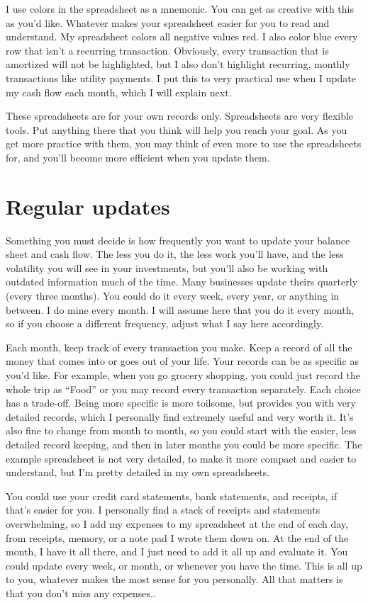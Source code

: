 I use colors in the spreadsheet as a mnemonic. You can get as creative with this as you'd like. Whatever makes your spreadsheet easier for you to read and understand. My spreadsheet colors all negative values red. I also color blue every row that isn't a recurring transaction. Obviously, every transaction that is amortized will not be highlighted, but I also don't highlight recurring, monthly transactions like utility payments. I put this to very practical use when I update my cash flow each month, which I will explain next.

These spreadsheets are for your own records only. Spreadsheets are very flexible tools. Put anything there that you think will help you reach your goal. As you get more practice with them, you may think of even more to use the spreadsheets for, and you'll become more efficient when you update them.

\section{Regular updates}
Something you must decide is how frequently you want to update your balance sheet and cash flow. The less you do it, the less work you'll have, and the less volatility you will see in your investments, but you'll also be working with outdated information much of the time. Many businesses update theirs quarterly (every three months). You could do it every week, every year, or anything in between. I do mine every month. I will assume here that you do it every month, so if you choose a different frequency, adjust what I say here accordingly.

Each month, keep track of every transaction you make. Keep a record of all the money that comes into or goes out of your life. Your records can be as specific as you'd like. For example, when you go grocery shopping, you could just record the whole trip as ``Food'' or you may record every transaction separately. Each choice has a trade-off. Being more specific is more toilsome, but provides you with very detailed records, which I personally find extremely useful and very worth it. It's also fine to change from month to month, so you could start with the easier, less detailed record keeping, and then in later months you could be more specific. The example spreadsheet is not very detailed, to make it more compact and easier to understand, but I'm pretty detailed in my own spreadsheets.

You could use your credit card statements, bank statements, and receipts, if that's easier for you. I personally find a stack of receipts and statements overwhelming, so I add my expenses to my spreadsheet at the end of each day, from receipts, memory, or a note pad I wrote them down on. At the end of the month, I have it all there, and I just need to add it all up and evaluate it. You could update every week, or month, or whenever you have the time. This is all up to you, whatever makes the most sense for you personally. All that matters is that you don't miss any expenses..


